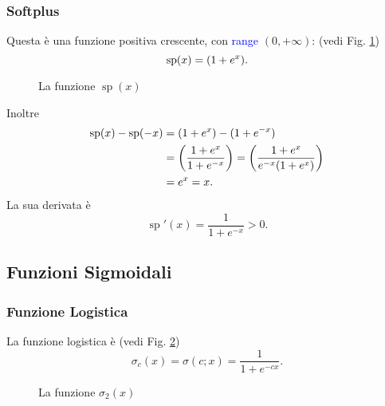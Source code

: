 \documentclass[10pt]{book}
\newcommand{\1}{\mathds{1}}
\let\ln\relax
\DeclareMathOperator{\ln}{ln}
\theoremstyle{definition}%
\theoremstyle{plain}
\theoremstyle{remark}
\renewcommand{\href}[2]{\textcolor{blue}{#2}}
\begin{document}
\subsubsection{Softplus}
\label{sec:org4585b8f}

Questa è una funzione positiva crescente, con \href{../../../../../org/roam/20250202173528-dominio_range_e_campo_di_una_classe_relazione.org}{range} \((0,+\infty)\): (vedi Fig. \ref{fig:sp})
\begin{equation*}
\operatorname{sp}(x) = \ln(1+e^{x}).
\end{equation*}

\begin{figure}
\begin{center}
\end{center}
\caption{La funzione \(\operatorname{sp}(x)\)}\label{fig:sp}
\end{figure}

Inoltre
\begin{align*}
\operatorname{sp}(x)- \operatorname{sp}(-x) &= \ln(1+e^{x}) - \ln(1+e^{-x}) \\
&= \ln\left(\frac{1+e^{x}}{1+e^{-x}}\right) = \ln\left(\frac{1+e^{x}}{e^{-x}(1+e^{x})}\right) \\
&= \ln e^{x} = x.
\end{align*}
La sua derivata è
\begin{equation*}
\operatorname{sp}'(x) = \frac{1}{1+e^{-x}}>0.
\end{equation*}
\subsection{Funzioni Sigmoidali}
\label{sec:org55f32c9}

\subsubsection{Funzione Logistica}
\label{sec:orgb858b24}
La funzione logistica è (vedi Fig. \ref{fig:logistic})
\begin{equation*}
\sigma_{c}(x) = \sigma(c;x) = \frac{1}{1+e^{-cx}}.
\end{equation*}

\begin{figure}
\begin{center}
\end{center}
\caption{La funzione \(\sigma_{2}(x)\)}\label{fig:logistic}
\end{figure}
\end{document}
